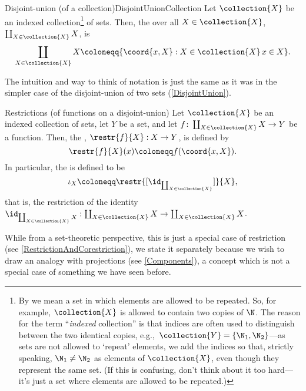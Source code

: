 \begin{dfn}{Disjoint-union (of a collection)}{DisjointUnionCollection}
Let $\collection{X}$ be an indexed collection\footnote{By  we mean a set in which elements are allowed to be repeated.  So, for example, $\collection{X}$ is allowed to contain two copies of $\N$.  The reason for the term ``\emph{indexed} collection'' is that indices are often used to distinguish between the two identical copies, e.g.,~$\collection{Y}=\{ \N _1,\N _2\}$---as sets are not allowed to `repeat' elements, we add the indices so that, strictly speaking, $\N _1\neq \N _2$ as elements of $\collection{X}$, even though they represent the same set.  (If this is confusing, don't think about it too hard---it's just a set where elements are allowed to be repeated.)} of sets.  Then, the  over all $X\in \collection{X}$, $\coprod _{X\in \collection{X}}X$, is
\begin{equation}
\coprod _{X\in \collection{X}}X\coloneqq \{ \coord{x,X}:X\in \collection{X}\, x\in X\} .
\end{equation}
\begin{rmk}
The intuition and way to think of notation is just the same as it was in the simpler case of the disjoint-union of two sets (\cref{DisjointUnion}).
\end{rmk}
\end{dfn}
\begin{dfn}{Restrictions (of functions on a disjoint-union)}{}
Let $\collection{X}$ be an indexed collection of sets, let $Y$ be a set, and let $f\colon \coprod _{X\in \collection{X}}X\rightarrow Y$ be a function.  Then, the , $\restr{f}{X}:X\rightarrow Y$, is defined by
\begin{equation}
\restr{f}{X}(x)\coloneqq f(\coord{x,X}).
\end{equation}
In particular, the  is defined to be
\begin{equation}
\iota _X\coloneqq \restr{[\id _{\coprod _{X\in \collection{X}}}]}{X},
\end{equation}
that is, the restriction of the identity $\id _{\coprod _{X\in \collection{X}}X}:\coprod _{X\in \collection{X}}X\rightarrow \coprod _{X\in \collection{X}}X$.
\begin{rmk}
While from a set-theoretic perspective, this is just a special case of restriction (see \cref{RestrictionAndCorestriction}), we state it separately because we wish to draw an analogy with projections (see \cref{Components}), a concept which is not a special case of something we have seen before. 
\end{rmk}
\end{dfn}

